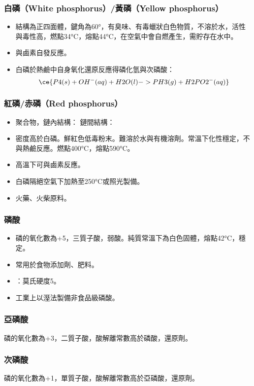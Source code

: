 \documentclass[a4paper,12pt]{report}
\begin{document}
\subsubsection{白磷（White phosphorus）/黃磷（Yellow phosphorus）}
\begin{itemize}
\item 結構為正四面體，鍵角為60°，有臭味、有毒蠟狀白色物質，不溶於水，活性與毒性高，燃點34°C，熔點44°C，在空氣中會自燃產生，需貯存在水中。
\item 與鹵素自發反應。
\item 白磷於熱鹼中自身氧化還原反應得磷化氫與次磷酸：
\[\ce{P4(s) + OH^-(aq) + H2O(l) -> PH3(g) + H2PO2^-(aq)}\]
\end{itemize}
\subsubsection{紅磷/赤磷（Red phosphorus）}
\begin{itemize}
\item 聚合物，鏈內結構：
\bct\bfH\ctr{}\ef\FB\ect
鏈間結構：
\bct\bfH\ctr{}\ef\FB\ect
\item 密度高於白磷。鮮紅色低毒粉末。難溶於水與有機溶劑。常溫下化性穩定，不與熱鹼反應。燃點400°C，熔點590°C。
\item 高溫下可與鹵素反應。
\item 白磷隔絕空氣下加熱至250°C或照光製備。
\item 火藥、火柴原料。
\end{itemize}
\subsubsection{磷酸}
\begin{itemize}
\item 磷的氧化數為+5，三質子酸，弱酸。純質常溫下為白色固體，熔點42°C，穩定。
\item 常用於食物添加劑、肥料。
\item {}：莫氏硬度5。
\item 工業上以溼法製備非食品級磷酸。
\end{itemize}
\subsubsection{亞磷酸}
磷的氧化數為+3，二質子酸，酸解離常數高於磷酸，還原劑。
\subsubsection{次磷酸}
磷的氧化數為+1，單質子酸，酸解離常數高於亞磷酸，還原劑。
\end{document}
